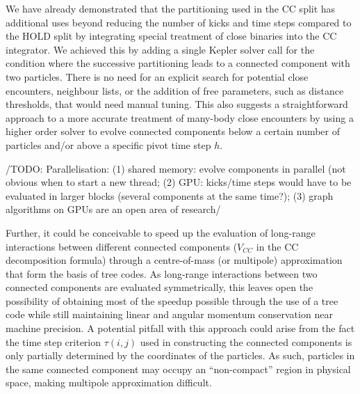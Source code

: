 \documentclass[referee]{aa}
\begin{document}
We have already demonstrated that the partitioning used in the CC
split has additional uses beyond reducing the number of kicks and
time steps compared to the HOLD split by integrating special treatment
of close binaries into the CC integrator. We achieved this by adding
a single Kepler solver call for the condition where the successive
partitioning leads to a connected component with two particles. There
is no need for an explicit search for potential close encounters,
neighbour lists, or the addition of free parameters, such as distance
thresholds, that would need manual tuning.\cite{Konstantinidis:2010hx}
This also suggests a straightforward approach to a more accurate treatment
of many-body close encounters by using a higher order solver to evolve
connected components below a certain number of particles and/or above
a specific pivot time step $h$.

/TODO: Parallelisation: (1) shared memory: evolve components in parallel
(not obvious when to start a new thread; (2) GPU: kicks/time steps
would have to be evaluated in larger blocks (several components at
the same time?); (3) graph algorithms on GPUs are an open area of
research/

Further, it could be conceivable to speed up the evaluation of long-range
interactions between different connected components ($V_{CC}$ in
the CC decomposition formula) through a centre-of-mass (or multipole)
approximation that form the basis of tree codes.\cite{Barnes:1986ed}
As long-range interactions between two connected components are evaluated
symmetrically, this leaves open the possibility of obtaining most
of the speedup possible through the use of a tree code while still
maintaining linear and angular momentum conservation near machine
precision. A potential pitfall with this approach could arise from
the fact the time step criterion $\tau(i,j)$ used in constructing
the connected components is only partially determined by the coordinates
of the particles. As such, particles in the same connected component
may occupy an ``non-compact'' region in physical space, making multipole
approximation difficult.
\end{document}
